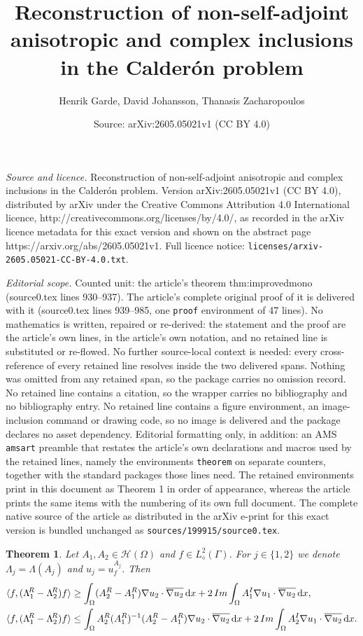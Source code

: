 \documentclass[10pt,a4paper]{amsart}
\title{Reconstruction of non-self-adjoint anisotropic and complex inclusions in the Calder\'on problem}
\author{Henrik Garde, David Johansson, Thanasis Zacharopoulos}
\date{Source: arXiv:2605.05021v1 (CC BY 4.0)}
\newtheorem{theorem}{Theorem}
\newcommand{\AI}{A\upI}
\newcommand{\AR}{A\upR}
\newcommand{\LambdaR}{\Lambda\uptR}
\newcommand{\di}{\mathrm{d}}   %
\newcommand{\imdel}{\mathop{\textup{Im}}}
\newcommand{\inner}[1]{\langle#1\rangle}
\newcommand{\upI}{^{\textup{I}}}
\newcommand{\upR}{^{\textup{R}}}
\newcommand{\uptR}{^{\!\textup{R}}}
\begin{document}
\maketitle

\noindent\emph{Source and licence.} Reconstruction of non-self-adjoint anisotropic and complex inclusions in the Calder\'on problem. Version arXiv:2605.05021v1 (CC BY 4.0), distributed by arXiv under the Creative Commons Attribution 4.0 International licence, http://creativecommons.org/licenses/by/4.0/, as recorded in the arXiv licence metadata for this exact version and shown on the abstract page https://arxiv.org/abs/2605.05021v1. Full licence notice: \texttt{licenses/arxiv-2605.05021-CC-BY-4.0.txt}.\par\smallskip

\noindent\textit{Editorial scope.} Counted unit: the article's theorem thm:improvedmono (source0.tex lines 930--937). The article's complete original proof of it is delivered with it (source0.tex lines 939--985, one \texttt{proof} environment of 47 lines). No mathematics is written, repaired or re-derived: the statement and the proof are the article's own lines, in the article's own notation, and no retained line is substituted or re-flowed.  No further source-local context is needed: every cross-reference of every retained line resolves inside the two delivered spans.  Nothing was omitted from any retained span, so the package carries no omission record.  No retained line contains a citation, so the wrapper carries no bibliography and no bibliography entry.  No retained line contains a figure environment, an image-inclusion command or drawing code, so no image is delivered and the package declares no asset dependency.  Editorial formatting only, in addition: an AMS \texttt{amsart} preamble that restates the article's own declarations and macros used by the retained lines, namely the environments \texttt{theorem} on separate counters, together with the standard packages those lines need.  The retained environments print in this document as Theorem 1 in order of appearance, whereas the article prints the same items with the numbering of its own full document.  The complete native source of the article as distributed in the arXiv e-print for this exact version is bundled unchanged as \texttt{sources/199915/source0.tex}.
	\begin{theorem}\label{thm:improvedmono}
		Let $A_1,A_2\in\mathcal{H}(\Omega)$ and $f\in L^2_\diamond(\Gamma)$. For $j\in\{1,2\}$ we denote $\Lambda_j = \Lambda(A_j)$ and $u_j = u_f^{A_j}$. Then
		\begin{align*}
			\inner{f,(\LambdaR_1-\LambdaR_2) f} &\geq \int_\Omega (\AR_2-\AR_1)\nabla u_2\cdot \overline{\nabla u_2}\,\di x + 2\imdel\int_\Omega \AI_1\nabla u_1\cdot\overline{\nabla u_2}\,\di x,  \\
			\inner{f,(\LambdaR_1-\LambdaR_2) f} &\leq \int_\Omega \AR_2(\AR_1)^{-1}(\AR_2-\AR_1)\nabla u_2\cdot\overline{\nabla u_2}\,\di x + 2\imdel \int_\Omega \AI_2\nabla u_1\cdot\overline{\nabla u_2}\,\di x.
		\end{align*}
	\end{theorem}
\end{document}
